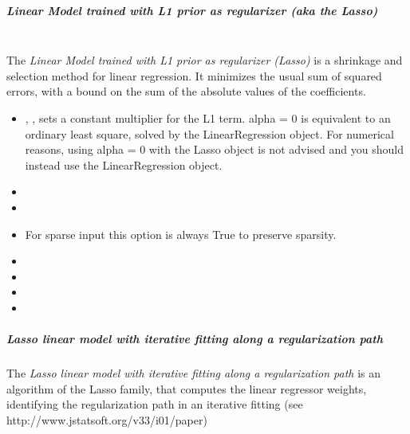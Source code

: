 \subparagraph{Linear Model trained with L1 prior as regularizer (aka the Lasso)}
\mbox{}
\\The \textit{Linear Model trained with L1 prior as regularizer (Lasso)} is a
shrinkage and selection method for linear regression.
%
It minimizes the usual sum of squared errors, with a bound on the sum of the
absolute values of the coefficients.
%
\begin{itemize}
  \item {}, , sets a constant
  multiplier for the L1 term.
  alpha = 0 is equivalent to an ordinary least square, solved by the
  LinearRegression object.
  For numerical reasons, using alpha = 0 with the Lasso object is not advised
  and you should instead use the LinearRegression object.
  \item {}
  \item {}
  \item {}
  \nb For sparse input this option is always True to preserve sparsity.
  \item {}
  \item {}
  \item {}
  \item {}
\end{itemize}
\subparagraph{Lasso linear model with iterative fitting along a regularization
  path}
\mbox{}

The \textit{Lasso linear model with iterative fitting along a regularization
path} is an algorithm of the Lasso family, that computes the linear regressor weights,
identifying the regularization path in an iterative fitting (see http://www.jstatsoft.org/v33/i01/paper)

